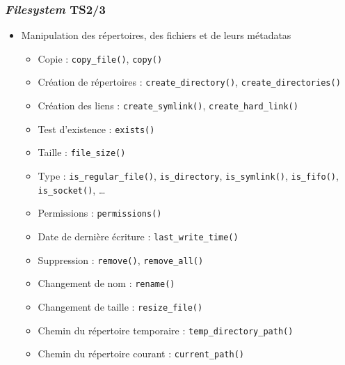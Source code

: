 \documentclass[C++.tex]{subfiles}
\begin{document}
\begin{frame}[fragile]
	\frametitle{\textit{Filesystem} TS\titlehfill{}2/3}
	\begin{itemize}
		\item Manipulation des répertoires, des fichiers et de leurs métadatas
		\begin{itemize}
			\item Copie : \lstinline|copy_file()|, \lstinline|copy()|
			\item Création de répertoires : \lstinline|create_directory()|, \lstinline|create_directories()|


			\item Création des liens : \lstinline|create_symlink()|, \lstinline|create_hard_link()|
			\item Test d'existence : \lstinline|exists()|
			\item Taille : \lstinline|file_size()|
			\item Type : \lstinline|is_regular_file()|, \lstinline|is_directory|, \lstinline|is_symlink()|, \lstinline|is_fifo()|, \lstinline|is_socket()|, \ldots
			\item Permissions : \lstinline|permissions()|
			\item Date de dernière écriture : \lstinline|last_write_time()|
			\item Suppression : \lstinline|remove()|, \lstinline|remove_all()|


			\item Changement de nom : \lstinline|rename()|
			\item Changement de taille : \lstinline|resize_file()|
			\item Chemin du répertoire temporaire : \lstinline|temp_directory_path()|
			\item Chemin du répertoire courant : \lstinline|current_path()|
		\end{itemize}
	\end{itemize}
\end{frame}
\end{document}
